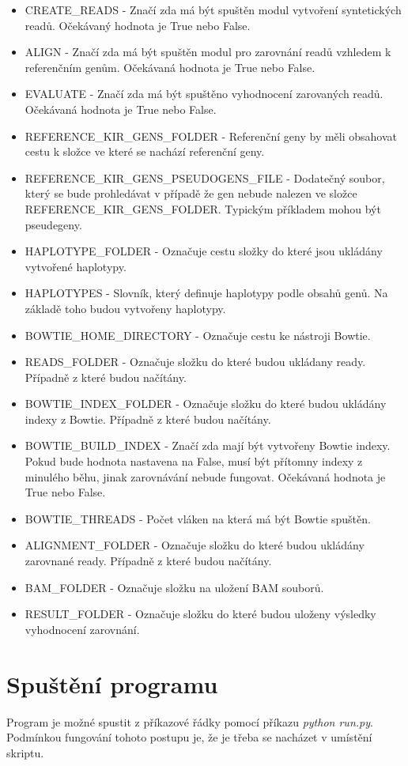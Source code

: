 \documentclass[czech,DP]{thesiskiv}
\numberwithin{equation}{section}
\begin{document}
\begin{itemize}
	\item CREATE\_READS - Značí zda má být spuštěn modul vytvoření syntetických readů. Očekávaný hodnota je True nebo False.
	\item ALIGN - Značí zda má být spuštěn modul pro zarovnání readů vzhledem k referenčním genům. Očekávaná hodnota je True nebo False.
	\item EVALUATE - Značí zda má být spuštěno vyhodnocení zarovaných readů. Očekávaná hodnota je True nebo False.
	\item REFERENCE\_KIR\_GENS\_FOLDER - Referenční geny by měli obsahovat cestu k složce ve které se nachází referenční geny.
	\item REFERENCE\_KIR\_GENS\_PSEUDOGENS\_FILE - Dodatečný soubor, který se bude prohledávat v případě že gen nebude nalezen ve složce REFERENCE\_KIR\_GENS\_FOLDER. Typickým příkladem mohou být pseudegeny. 
	\item HAPLOTYPE\_FOLDER - Označuje cestu složky do které jsou ukládány vytvořené haplotypy. 
	\item HAPLOTYPES - Slovník, který definuje haplotypy podle obsahů genů. Na základě toho budou vytvořeny haplotypy.
	\item BOWTIE\_HOME\_DIRECTORY - Označuje cestu ke nástroji Bowtie.
	\item READS\_FOLDER - Označuje složku do které budou ukládany ready. Případně z které budou načítány.
	\item BOWTIE\_INDEX\_FOLDER - Označuje složku do které budou ukládány indexy z Bowtie. Případně z které budou načítány. 
	\item BOWTIE\_BUILD\_INDEX - Značí zda mají být vytvořeny Bowtie indexy. Pokud bude hodnota nastavena na False, musí být přítomny indexy z minulého běhu, jinak zarovnávání nebude fungovat. Očekávaná hodnota je True nebo False.
	\item BOWTIE\_THREADS - Počet vláken na která má být Bowtie spuštěn.	
	\item ALIGNMENT\_FOLDER - Označuje složku do které budou ukládány zarovnané ready. Případně z které budou načítány. 
	\item BAM\_FOLDER - Označuje složku na uložení BAM souborů.  
	\item RESULT\_FOLDER - Označuje složku do které budou uloženy výsledky vyhodnocení zarovnání.
\end{itemize}


\section{Spuštění programu}
Program je možné spustit z příkazové řádky pomocí příkazu \textit {python run.py}. Podmínkou fungování tohoto postupu je, že je třeba se nacházet v umístění skriptu. 
\end{document}
